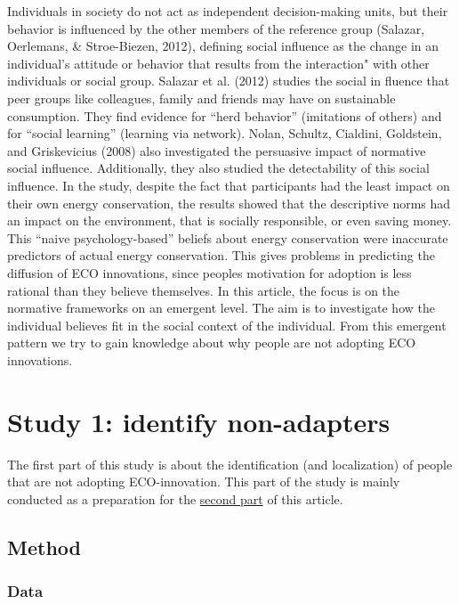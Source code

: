\documentclass[man,floatsintext]{apa6}
\begin{document}
Individuals in society do not act as independent decision-making units,
but their behavior is influenced by the other members of the reference
group (Salazar, Oerlemans, \& Stroe-Biezen, 2012), defining social
influence as the change in an individual's attitude or behavior that
results from the interaction" with other individuals or social group.
Salazar et al. (2012) studies the social in fluence that peer groups
like colleagues, family and friends may have on sustainable consumption.
They find evidence for \enquote{herd behavior} (imitations of others)
and for \enquote{social learning} (learning via network). Nolan,
Schultz, Cialdini, Goldstein, and Griskevicius (2008) also investigated
the persuasive impact of normative social influence. Additionally, they
also studied the detectability of this social influence. In the study,
despite the fact that participants had the least impact on their own
energy conservation, the results showed that the descriptive norms had
an impact on the environment, that is socially responsible, or even
saving money. This \enquote{naive psychology-based} beliefs about energy
conservation were inaccurate predictors of actual energy conservation.
This gives problems in predicting the diffusion of ECO innovations,
since peoples motivation for adoption is less rational than they believe
themselves. In this article, the focus is on the normative frameworks on
an emergent level. The aim is to investigate how the individual believes
fit in the social context of the individual. From this emergent pattern
we try to gain knowledge about why people are not adopting ECO
innovations.

\section{\texorpdfstring{Study 1: identify non-adapters
\label{Study1}}{Study 1: identify non-adapters }}\label{study-1-identify-non-adapters}

The first part of this study is about the identification (and
localization) of people that are not adopting ECO-innovation. This part
of the study is mainly conducted as a preparation for the
\hyperref[Study2]{second part} of this article.

\subsection{Method}\label{method}

\subsubsection{Data}\label{data}
\end{document}
